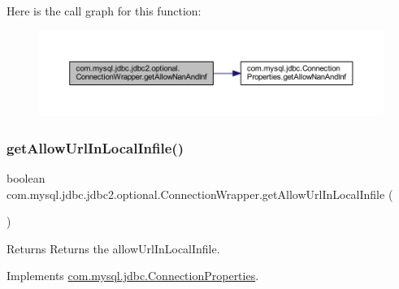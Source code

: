 Here is the call graph for this function\+:
\nopagebreak
\begin{figure}[H]
\begin{center}
\leavevmode
\includegraphics[width=350pt]{classcom_1_1mysql_1_1jdbc_1_1jdbc2_1_1optional_1_1_connection_wrapper_ae732025b7fe6d97377f2bd477fb87aea_cgraph}
\end{center}
\end{figure}
\mbox{\label{classcom_1_1mysql_1_1jdbc_1_1jdbc2_1_1optional_1_1_connection_wrapper_a16443b33fa3689cee078616f0a58f29a}} 
\subsubsection{\texorpdfstring{get\+Allow\+Url\+In\+Local\+Infile()}{getAllowUrlInLocalInfile()}}
{\footnotesize\ttfamily boolean com.\+mysql.\+jdbc.\+jdbc2.\+optional.\+Connection\+Wrapper.\+get\+Allow\+Url\+In\+Local\+Infile (\begin{DoxyParamCaption}{ }\end{DoxyParamCaption})}

\begin{DoxyReturn}{Returns}
Returns the allow\+Url\+In\+Local\+Infile. 
\end{DoxyReturn}


Implements \mbox{\hyperlink{interfacecom_1_1mysql_1_1jdbc_1_1_connection_properties_aa0b1ef6e51c18b41376c5651833f11b8}{com.\+mysql.\+jdbc.\+Connection\+Properties}}.

